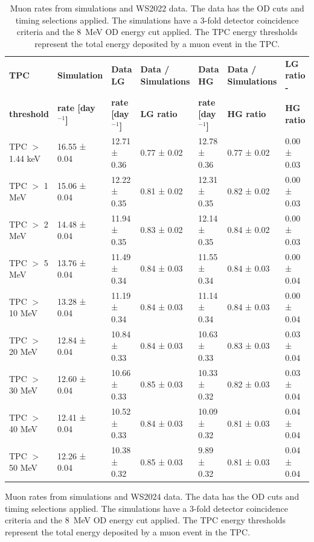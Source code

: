 \begin{landscape}
\begin{table}[ht!]
    \centering
    \caption{Muon rates from simulations and WS2022 data. The data has the OD cuts and timing selections applied. The simulations have a 3-fold detector coincidence criteria and the 8~MeV OD energy cut applied. The TPC energy thresholds represent the total energy deposited by a muon event in the TPC.}
    \begin{tabular}{lllllll}
    \hline\hline
    \textbf{TPC} & \textbf{Simulation} & \textbf{Data LG} & \textbf{Data / Simulations} & \textbf{Data HG} & \textbf{Data / Simulations} & \textbf{LG ratio -} \\
    \textbf{threshold} & \textbf{rate [day$^{-1}$]} & \textbf{rate [day$^{-1}$]} & \textbf{LG ratio} & \textbf{rate [day$^{-1}$]} & \textbf{HG ratio} & \textbf{HG ratio} \\
    \hline
    TPC $>$ 1.44 keV &  16.55 ± 0.04 &  12.71 ± 0.36 & 0.77 ± 0.02  &  12.78 ± 0.36 & 0.77 ± 0.02  & 0.00 ± 0.03 \\ 
    TPC $>$ 1 MeV &  15.06 ± 0.04 &  12.22 ± 0.35 & 0.81 ± 0.02  &  12.31 ± 0.35 & 0.82 ± 0.02  & 0.00 ± 0.03 \\
    TPC $>$ 2 MeV &  14.48 ± 0.04 &  11.94 ± 0.35 & 0.83 ± 0.02  &  12.14 ± 0.35 & 0.84 ± 0.02  & 0.00 ± 0.03 \\
    TPC $>$ 5 MeV &  13.76 ± 0.04 &  11.49 ± 0.34 & 0.84 ± 0.03  &  11.55 ± 0.34 & 0.84 ± 0.03  & 0.00 ± 0.04 \\
    TPC $>$ 10 MeV &  13.28 ± 0.04 &  11.19 ± 0.34 & 0.84 ± 0.03 &  11.14 ± 0.34 & 0.84 ± 0.03  & 0.00 ± 0.04 \\
    TPC $>$ 20 MeV &  12.84 ± 0.04 &  10.84 ± 0.33 & 0.84 ± 0.03  &  10.63 ± 0.33 & 0.83 ± 0.03  & 0.03 ± 0.04 \\
    TPC $>$ 30 MeV &  12.60 ± 0.04 &  10.66 ± 0.33 & 0.85 ± 0.03  &  10.33 ± 0.32 & 0.82 ± 0.03  & 0.03 ± 0.04 \\
    TPC $>$ 40 MeV &  12.41 ± 0.04 &  10.52 ± 0.33 & 0.84 ± 0.03  &  10.09 ± 0.32 & 0.81 ± 0.03  & 0.04 ± 0.04 \\
    TPC $>$ 50 MeV &  12.26 ± 0.04 &  10.38 ± 0.32 & 0.85 ± 0.03  &   9.89 ± 0.32 & 0.81 ± 0.03  & 0.04 ± 0.04 \\
    \hline\hline
    \end{tabular}
    \label{tab:Muons/Rates2022}
\end{table}
\begin{table}[ht!]
    \centering
    \caption{Muon rates from simulations and WS2024 data. The data has the OD cuts and timing selections applied. The simulations have a 3-fold detector coincidence criteria and the 8~MeV OD energy cut applied. The TPC energy thresholds represent the total energy deposited by a muon event in the TPC.}

\end{table}
\end{landscape}
